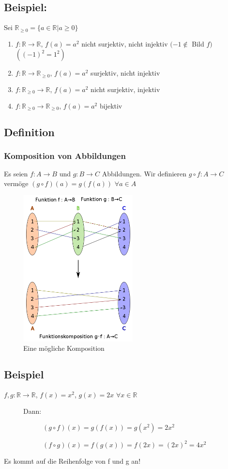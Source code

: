 \subsection{Beispiel:}
	Sei $\mathbb{R}_{\geq0}=\{a \in \mathbb{R}|a \geq 0\}$
	\begin{enumerate}
		\item $f: \mathbb{R} \rightarrow \mathbb{R}$, $f(a)=a^{2}$ nicht surjektiv, nicht injektiv $(-1 \notin$ Bild $f)$ $((-1)^{2} = 1^{2})$
		\item $f: \mathbb{R} \rightarrow \mathbb{R}_{\geq0}$, $f(a) = a^{2}$ surjektiv, nicht injektiv
		\item $f: \mathbb{R}_{\geq0} \rightarrow \mathbb{R}$, $f(a) = a^{2}$ nicht surjektiv, injektiv
		\item $f: \mathbb{R}_{\geq0} \rightarrow \mathbb{R}_{\geq0}$, $f(a) = a^{2}$ bijektiv
	\end{enumerate}
%
%
%
\subsection{Definition}
\subsubsection{Komposition von Abbildungen }

Es seien $f: A \rightarrow B$ und $g: B\rightarrow C$ Abbildungen. 
Wir definieren $g \circ f: A\rightarrow C$ vermöge $(g \circ f) (a) = g(f(a))$ $\forall a\in A$
				\begin{figure} [H]
				\centering
				\includegraphics[width=6cm, height=8cm]{mainmatter/chapter1/pics/komposition.png}
				\caption{Eine mögliche Komposition} 
				\end{figure}
%
%
%
\subsection{Beispiel}
$f,g: \mathbb{R} \rightarrow \mathbb{R}$, $f(x)=x^{2}$, $g(x)=2x$ $\forall x \in \mathbb{R}$ 
	\begin{description}
		\item[] Dann:
		\begin{description}
			\item[] $(g \circ f)(x) = g(f(x)) = g(x^{2}) = 2x^{2}$
			\item[] $(f \circ g)(x) = f(g(x)) = f(2x) = (2x)^{2} = 4x^{2}$
		\end{description}
	\end{description}
Es kommt auf die Reihenfolge von f und g an!
%
%
%
